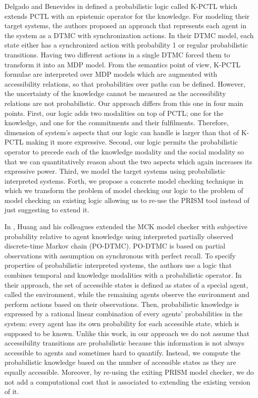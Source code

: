 Delgado and Benevides in \cite{Delgado2009} defined a
probabilistic logic called K-PCTL which extends PCTL with an
epistemic operator for the knowledge.
For modeling their target systems, the authors proposed an
approach that represents each agent in the system as a DTMC with
synchronization actions. In their DTMC model, each state either
has a synchronized action with probability 1 or regular
probabilistic transitions. Having two different actions in a
single DTMC forced them to transform it into an MDP model. From
the semantics point of view, K-PCTL formulae are interpreted over
MDP models which are augmented with accessibility relations, so
that probabilities over paths can be defined. However, the
uncertainty of the knowledge cannot be measured as the
accessibility relations are not probabilistic. Our approach
differs from this one in four main points. First, our logic
adds two modalities on top of PCTL; one for the knowledge,
and one for the commitments and their fulfilments. Therefore, dimension of system's aspects that our logic can handle is larger than that of K-PCTL making it more expressive. Second, our logic permits the
probabilistic operator to precede each of the knowledge modality
and the social modality so that we can quantitatively reason about
the two aspects which again increases its expressive power. Third,
we model the target systems using probabilistic interpreted
systems. Forth, we propose a concrete model checking technique in
which we transform the problem of model checking our logic to the
problem of model checking an existing logic allowing us to re-use
the PRISM tool instead of just suggesting to extend it.

In \cite{Huang2011}, Huang and his colleagues extended the MCK
model checker \cite{Gammie2004} with subjective probability
relative to agent knowledge using interpreted partially observed
discrete-time Markov chain (PO-DTMC). PO-DTMC is based on partial
observations with assumption on synchronous with perfect recall.
To specify properties of probabilistic interpreted systems, the
authors use a logic that combines temporal and knowledge
modalities with a probabilistic operator. In their approach, the
set of accessible states is defined as states of a special agent,
called the environment, while the remaining agents observe the
environment and perform actions based on their observations. Then,
probabilistic knowledge is expressed by a rational linear
combination of every agents' probabilities in the system: every
agent has its own probability for each accessible state, which is
supposed to be known. Unlike this work, in our approach we do not
assume that accessibility transitions are probabilistic because
this information is not always accessible to agents and sometimes
hard to quantify. Instead, we compute the probabilistic knowledge
based on the number of accessible states as they are equally
accessible. Moreover, by re-using the exiting PRISM model checker,
we do not add a computational cost that is associated to extending
the existing version of it.


